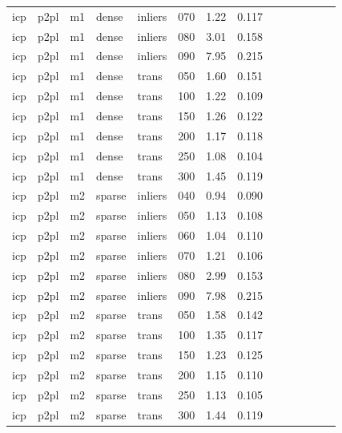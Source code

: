 \begin{table}[htbp]
\begin{tabular}{llllllrrrrrrrr}
  icp & p2pl & m1 & dense & inliers & 070 & 1.22 & 0.117 \\
  icp & p2pl & m1 & dense & inliers & 080 & 3.01 & 0.158 \\
  icp & p2pl & m1 & dense & inliers & 090 & 7.95 & 0.215 \\
  icp & p2pl & m1 & dense & trans & 050 & 1.60 & 0.151 \\
  icp & p2pl & m1 & dense & trans & 100 & 1.22 & 0.109 \\
  icp & p2pl & m1 & dense & trans & 150 & 1.26 & 0.122 \\
  icp & p2pl & m1 & dense & trans & 200 & 1.17 & 0.118 \\
  icp & p2pl & m1 & dense & trans & 250 & 1.08 & 0.104 \\
  icp & p2pl & m1 & dense & trans & 300 & 1.45 & 0.119 \\
  icp & p2pl & m2 & sparse & inliers & 040 & 0.94 & 0.090 \\
  icp & p2pl & m2 & sparse & inliers & 050 & 1.13 & 0.108 \\
  icp & p2pl & m2 & sparse & inliers & 060 & 1.04 & 0.110 \\
  icp & p2pl & m2 & sparse & inliers & 070 & 1.21 & 0.106 \\
  icp & p2pl & m2 & sparse & inliers & 080 & 2.99 & 0.153 \\
  icp & p2pl & m2 & sparse & inliers & 090 & 7.98 & 0.215 \\
  icp & p2pl & m2 & sparse & trans & 050 & 1.58 & 0.142 \\
  icp & p2pl & m2 & sparse & trans & 100 & 1.35 & 0.117 \\
  icp & p2pl & m2 & sparse & trans & 150 & 1.23 & 0.125 \\
  icp & p2pl & m2 & sparse & trans & 200 & 1.15 & 0.110 \\
  icp & p2pl & m2 & sparse & trans & 250 & 1.13 & 0.105 \\
  icp & p2pl & m2 & sparse & trans & 300 & 1.44 & 0.119 \\
\bottomrule
\end{tabular}
\end{table}

